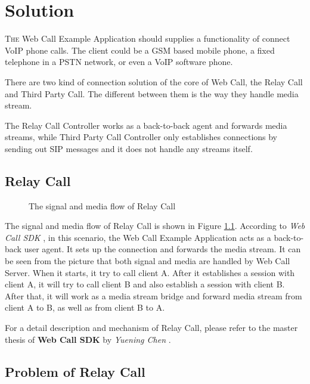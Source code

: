 \chapter{Solution}
\label{sec:Solution}

\lettrine[lines=3]{T}{he} Web Call Example Application should supplies a functionality of connect VoIP phone calls. The client could be a GSM based mobile phone, a fixed telephone in a PSTN network, or even a VoIP software phone.

There are two kind of connection solution of the core of Web Call, the Relay Call and Third Party Call. The different between them is the way they handle media stream.

The Relay Call Controller works as a back-to-back agent and forwards media streams, while Third Party Call Controller only establishes connections by sending out SIP messages and it does not handle any streams itself. 

\section{Relay Call}
\label{sec:Solution:RelayCall}

\begin{figure}[!hbtp]
\centering
{}
\caption{The signal and media flow of Relay Call}
\label{fig:TheSignalAndMediaFlowOfRelayCall}
\end{figure}

The signal and media flow of Relay Call is shown in Figure \ref{fig:TheSignalAndMediaFlowOfRelayCall}. According to \textit{Web Call SDK} \cite{WebCallSDK}, in this scenario, the Web Call Example Application acts as a back-to-back user agent. It sets up the connection and forwards the media stream. It can be seen from the picture that both signal and media are handled by Web Call Server. When it starts, it try to call client A. After it establishes a session with client A, it will try to call client B and also establish a session with client B. After that, it will work as a media stream bridge and forward media stream from client A to B, as well as from client B to A.

For a detail description and mechanism of Relay Call, please refer to the master thesis of \textbf{Web Call SDK} by \textit{Yuening Chen} \cite{WebCallSDK}.

\section{Problem of Relay Call}
\label{sec:Solution:ProblemOfRelayCall}

